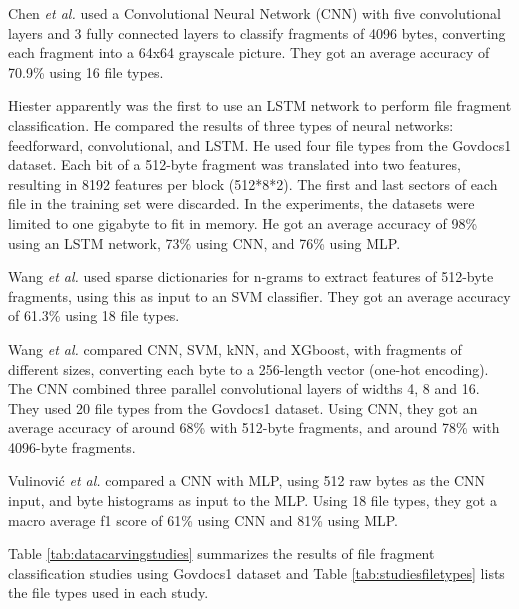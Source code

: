 Chen \textit{et al.} \cite{chen_file_2018}
used a Convolutional Neural Network (CNN) with five convolutional layers and 3 fully connected layers to classify fragments of 4096 bytes, converting each fragment into a 64x64 grayscale picture.
They got an average accuracy of 70.9\% using 16 file types.

Hiester \cite{hiester_file_2018} apparently was the first to use an LSTM network to perform file fragment classification. He compared the results of three types of neural networks: feedforward, convolutional, and LSTM. He used four file types from the Govdocs1 dataset.
Each bit of a 512-byte fragment was translated into two features, resulting in 8192 features per block (512*8*2). The first and last sectors of each file in the training set were discarded. In the experiments, the datasets were limited to one gigabyte to fit in memory. He got an average accuracy of 98\% using an LSTM network, 73\% using CNN, and 76\% using MLP.

Wang \textit{et al.} \cite{wang_sparse_2018} 
used sparse dictionaries for n-grams to extract features of 512-byte fragments, using this as input to an SVM classifier.
They got an average accuracy of 61.3\% using 18 file types.

Wang \textit{et al.} \cite{wang_file_2018}  
compared CNN, SVM, kNN, and XGboost, with fragments of different sizes, converting each byte to a 256-length vector (one-hot encoding). The CNN combined three parallel convolutional layers of widths 4, 8 and 16.
They used 20 file types from the Govdocs1 dataset.
Using CNN, they got an average accuracy of around 68\% with 512-byte fragments, and around 78\% with 4096-byte fragments.

Vulinović \textit{et al.} \cite{vulinovic_neural_2019}
compared a CNN with MLP, using 512 raw bytes as the CNN input, and byte histograms as input to the MLP.
Using 18 file types, they got a macro average f1 score  of 61\% using CNN and 81\% using MLP.


Table \ref{tab:datacarvingstudies} summarizes 
the results of file fragment classification studies using Govdocs1 dataset and Table \ref{tab:studiesfiletypes}
lists the file types used in each study.




